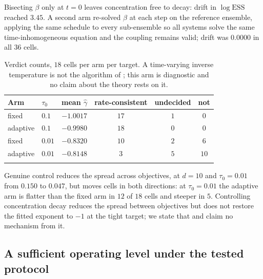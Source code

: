 \documentclass[pdflatex,sn-mathphys-num]{sn-jnl}
\theoremstyle{thmstyleone}
\theoremstyle{thmstyletwo}
\theoremstyle{thmstylethree}
\begin{document}
Bisecting $\beta$ only at $t=0$ leaves concentration free to decay: drift in $\log\mathrm{ESS}$ reached $3.45$. A second arm re-solved $\beta$ at each step on the reference ensemble, applying the same schedule to every sub-ensemble so all systems solve the same time-inhomogeneous equation and the coupling remains valid; drift was $0.0000$ in all $36$ cells.

\begin{table}[h]
\caption{Verdict counts, $18$ cells per arm per target. A time-varying inverse temperature is not the algorithm of \cite{fkr2024,ghv2025}; this arm is diagnostic and no claim about the theory rests on it.}\label{tab:control}
\begin{tabular}{@{}llcccc@{}}
\toprule
Arm & $\tau_0$ & mean $\hat\gamma$ & rate-consistent & undecided & not\\
\midrule
fixed & $0.1$ & $-1.0017$ & $17$ & $1$ & $0$\\
adaptive & $0.1$ & $-0.9980$ & $18$ & $0$ & $0$\\
fixed & $0.01$ & $-0.8320$ & $10$ & $2$ & $6$\\
adaptive & $0.01$ & $-0.8148$ & $3$ & $5$ & $10$\\
\botrule
\end{tabular}
\end{table}

Genuine control reduces the spread across objectives, at $d=10$ and $\tau_0=0.01$ from $0.150$ to $0.047$, but moves cells in both directions: at $\tau_0=0.01$ the adaptive arm is flatter than the fixed arm in $12$ of $18$ cells and steeper in $5$. Controlling concentration decay reduces the spread between objectives but does not restore the fitted exponent to $-1$ at the tight target; we state that and claim no mechanism from it.

\subsection{A sufficient operating level under the tested protocol}\label{sec:suff}
\end{document}
